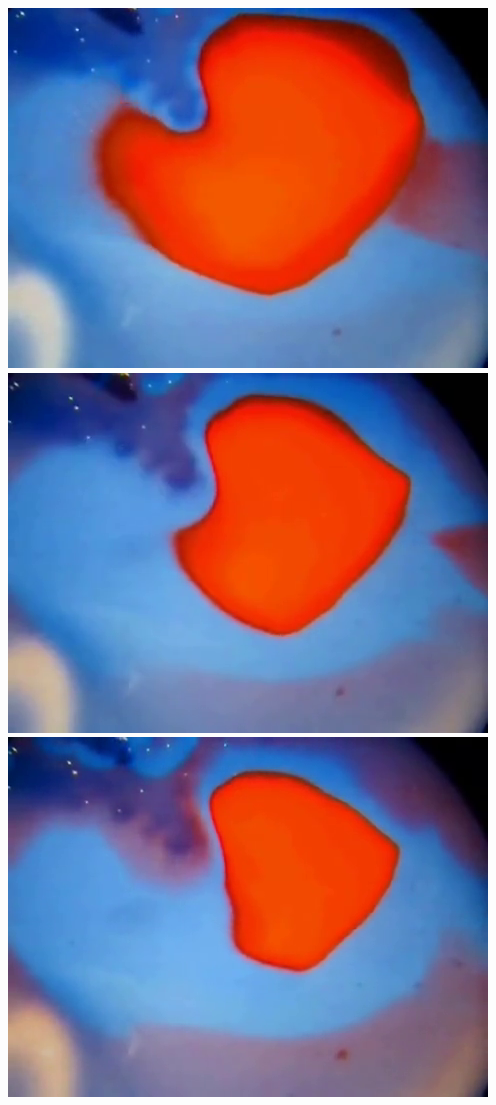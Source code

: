 \documentclass[12pt]{report}
\begin{document}
{%
\includegraphics[scale=0.25]{BZ-frames0003.png}
\includegraphics[scale=0.25]{BZ-frames0004.png}
\includegraphics[scale=0.25]{BZ-frames0005.png}
}
\end{document}
